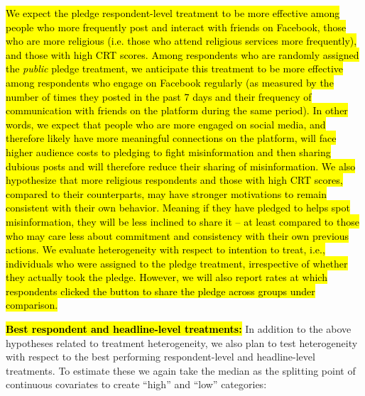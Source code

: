 \documentclass[letterpaper, 12pt, parskip=full,]{scrartcl}
\begin{document}
\hl{We expect the pledge respondent-level treatment to be more effective among people who more frequently post and interact with friends on Facebook, those who are more religious (i.e. those who attend religious services more frequently), and those with high CRT scores. Among respondents who are randomly assigned the \textit{public} pledge treatment, we anticipate this treatment to be more effective among respondents who engage on Facebook regularly (as measured by the number of times they posted in the past 7 days and their frequency of communication with friends on the platform during the same period). In other words, we expect that people who are more engaged on social media, and therefore likely have more meaningful connections on the platform, will face higher audience costs to pledging to fight misinformation and then sharing dubious posts and will therefore reduce their sharing of misinformation. We also hypothesize that more religious respondents and those with high CRT scores, compared to their counterparts, may have stronger motivations to remain consistent with their own behavior. Meaning if they have pledged to helps spot misinformation, they will be less inclined to share it -- at least compared to those who may care less about commitment and consistency with their own previous actions. We evaluate heterogeneity with respect to intention to treat, i.e., individuals who were assigned to the pledge treatment, irrespective of whether they actually took the pledge. However, we will also report rates at which respondents clicked the button to share the pledge across groups under comparison.}








\hl{\textbf{Best respondent and headline-level treatments:}} In addition to the above hypotheses related to treatment heterogeneity, we also plan to test heterogeneity with respect to the best performing respondent-level and headline-level treatments. To estimate these we again take the median as the splitting point of continuous covariates to create ``high'' and ``low'' categories: 
\end{document}
